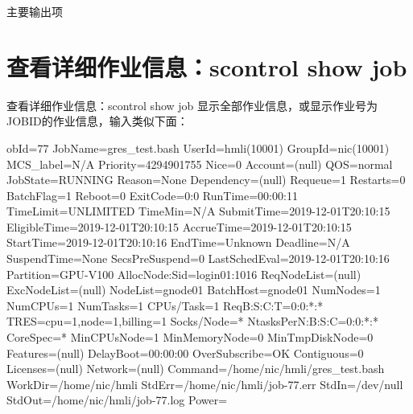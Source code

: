 \begin{frame}{主要输出项}
\end{frame}

\section{查看详细作业信息：scontrol show job}
\begin{frame}[fragile]{查看详细作业信息：scontrol show job}
显示全部作业信息，或显示作业号为JOBID的作业信息，输入类似下面：
\begin{OUT}
obId=77 JobName=gres_test.bash
   UserId=hmli(10001) GroupId=nic(10001) MCS_label=N/A
   Priority=4294901755 Nice=0 Account=(null) QOS=normal
   JobState=RUNNING Reason=None Dependency=(null)
   Requeue=1 Restarts=0 BatchFlag=1 Reboot=0 ExitCode=0:0
   RunTime=00:00:11 TimeLimit=UNLIMITED TimeMin=N/A
   SubmitTime=2019-12-01T20:10:15 EligibleTime=2019-12-01T20:10:15
   AccrueTime=2019-12-01T20:10:15
   StartTime=2019-12-01T20:10:16 EndTime=Unknown Deadline=N/A
   SuspendTime=None SecsPreSuspend=0 LastSchedEval=2019-12-01T20:10:16
   Partition=GPU-V100 AllocNode:Sid=login01:1016
   ReqNodeList=(null) ExcNodeList=(null)
   NodeList=gnode01
   BatchHost=gnode01
   NumNodes=1 NumCPUs=1 NumTasks=1 CPUs/Task=1 ReqB:S:C:T=0:0:*:*
   TRES=cpu=1,node=1,billing=1
   Socks/Node=* NtasksPerN:B:S:C=0:0:*:* CoreSpec=*
   MinCPUsNode=1 MinMemoryNode=0 MinTmpDiskNode=0
   Features=(null) DelayBoot=00:00:00
   OverSubscribe=OK Contiguous=0 Licenses=(null) Network=(null)
   Command=/home/nic/hmli/gres_test.bash
   WorkDir=/home/nic/hmli
   StdErr=/home/nic/hmli/job-77.err
   StdIn=/dev/null
   StdOut=/home/nic/hmli/job-77.log
   Power=
\end{OUT}
\end{frame}

